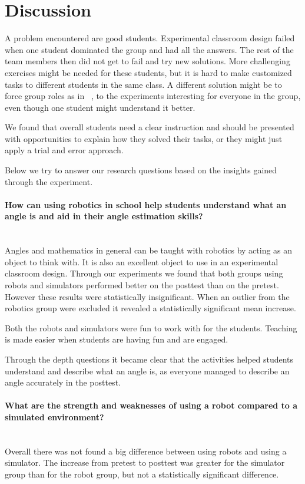 \section{Discussion}
A problem encountered are good students. Experimental classroom design failed when one student dominated the group and had all the answers. The rest of the team members then did not get to fail and try new solutions. More challenging exercises might be needed for these students, but it is hard to make customized tasks to different students in the same class. A different solution might be to force group roles as in ~\cite{mitnik2009collaborative}, to the experiments interesting for everyone in the group, even though one student might understand it better.

\bigskip\noindent
We found that overall students need a clear instruction and should be presented with opportunities to explain how they solved their tasks, or they might just apply a trial and error approach. 

\bigskip\noindent
Below we try to answer our research questions based on the insights gained through the experiment. 

\paragraph{How can using robotics in school help students understand what an angle is and aid in their angle estimation skills?}~\\
Angles and mathematics in general can be taught with robotics by acting as an object to think with. It is also an excellent object to use in an experimental classroom design. Through our experiments we found that both groups using robots and simulators performed better on the posttest than on the pretest. However these results were statistically insignificant. When an outlier from the robotics group were excluded it revealed a statistically significant mean increase. 

\bigskip\noindent
Both the robots and simulators were fun to work with for the students. Teaching is made easier when students are having fun and are engaged.

\bigskip\noindent
Through the depth questions it became clear that the activities helped students understand and describe what an angle is, as everyone managed to describe an angle accurately in the posttest. 

\paragraph{What are the strength and weaknesses of using a robot compared to a simulated environment?}~\\
Overall there was not found a big difference between using robots and using a simulator.
The increase from pretest to posttest was greater for the simulator group than for the robot group, but not a statistically significant difference. 

